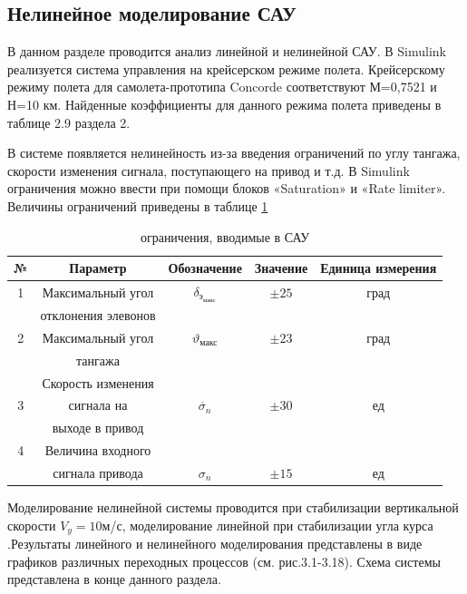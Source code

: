 \subsection{Нелинейное моделирование САУ}

В данном разделе проводится анализ линейной и нелинейной САУ. В Simulink реализуется система управления на крейсерском режиме полета. Крейсерскому режиму полета для самолета-прототипа Concorde соответствуют М=0,7521 и Н=10 км. Найденные коэффициенты для данного режима полета приведены в таблице 2.9 раздела 2. 

В системе появляется нелинейность из-за введения ограничений по углу тангажа, скорости изменения сигнала, поступающего на привод и т.д. В Simulink ограничения можно ввести при помощи блоков «Saturation» и «Rate limiter». Величины ограничений приведены в таблице \ref{tab:Нелинейности}

\begin{table}[H]
    \centering
    \caption{ограничения, вводимые в САУ}
    \begin{tabular}{|c|c|c|c|c|}
    \hline
        № & Параметр & Обозначение & Значение & Единица измерения \\ \hline
        1 & Максимальный угол & $\delta_\text{э}_\text{макс}$ & $\pm 25$ & град \\ 
         & отклонения элевонов &  &  & \\ \hline
        2 & Максимальный угол & $\vartheta_\text{макс}$ & $\pm 23$ & град\\
         & тангажа &  &  & \\ \hline
         & Скорость изменения &  &  & \\ 
        3 & сигнала на & $\dot{\sigma_n}$ & $\pm 30$ &ед \\ 
        & выходе в привод &  &  & \\ \hline
        4 & Величина входного &  &  & \\ 
         & сигнала привода & $\sigma_n$ & $\pm 15$ &ед \\ \hline
    \end{tabular}
    \label{tab:Нелинейности}
\end{table}

Моделирование нелинейной системы проводится при стабилизации вертикальной скорости $V_y = 10$м/с, моделирование линейной при стабилизации угла курса  .Результаты линейного и нелинейного моделирования представлены в виде графиков различных переходных процессов (см. рис.3.1-3.18). Схема системы представлена в конце данного раздела.

